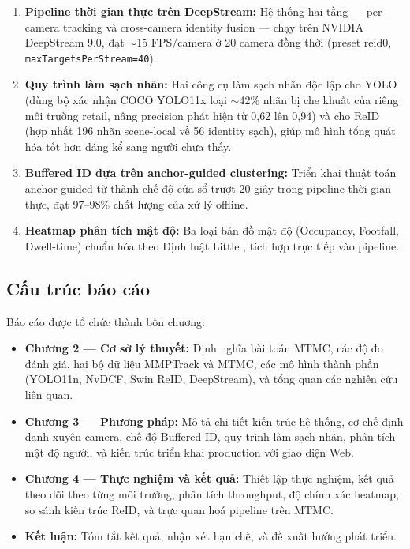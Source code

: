 \documentclass{article} %
\begin{document}
\begin{enumerate}
    \item \textbf{Pipeline thời gian thực trên DeepStream:} Hệ thống hai tầng --- per-camera tracking và cross-camera identity fusion --- chạy trên NVIDIA DeepStream 9.0, đạt $\sim$15 FPS/camera ở 20 camera đồng thời (preset reid0, \texttt{maxTargetsPerStream=40}).

    \item \textbf{Quy trình làm sạch nhãn:} Hai công cụ làm sạch nhãn độc lập cho YOLO (dùng bộ xác nhận COCO YOLO11x loại $\sim$42\% nhãn bị che khuất của riêng môi trường retail, nâng precision phát hiện từ 0,62 lên 0,94) và cho ReID (hợp nhất 196 nhãn scene-local về 56 identity sạch), giúp mô hình tổng quát hóa tốt hơn đáng kể sang người chưa thấy.

    \item \textbf{Buffered ID dựa trên anchor-guided clustering:} Triển khai thuật toán anchor-guided từ \cite{Huang2023} thành chế độ cửa sổ trượt 20 giây trong pipeline thời gian thực, đạt 97--98\% chất lượng của xử lý offline.

    \item \textbf{Heatmap phân tích mật độ:} Ba loại bản đồ mật độ (Occupancy, Footfall, Dwell-time) chuẩn hóa theo Định luật Little \cite{Little1961}, tích hợp trực tiếp vào pipeline.
\end{enumerate}

\subsection{Cấu trúc báo cáo}

Báo cáo được tổ chức thành bốn chương:

\begin{itemize}
    \item \textbf{Chương 2 --- Cơ sở lý thuyết:} Định nghĩa bài toán MTMC, các độ đo đánh giá, hai bộ dữ liệu MMPTrack và MTMC, các mô hình thành phần (YOLO11n, NvDCF, Swin ReID, DeepStream), và tổng quan các nghiên cứu liên quan.

    \item \textbf{Chương 3 --- Phương pháp:} Mô tả chi tiết kiến trúc hệ thống, cơ chế định danh xuyên camera, chế độ Buffered ID, quy trình làm sạch nhãn, phân tích mật độ người, và kiến trúc triển khai production với giao diện Web.

    \item \textbf{Chương 4 --- Thực nghiệm và kết quả:} Thiết lập thực nghiệm, kết quả theo dõi theo từng môi trường, phân tích throughput, độ chính xác heatmap, so sánh kiến trúc ReID, và trực quan hoá pipeline trên MTMC.

    \item \textbf{Kết luận:} Tóm tắt kết quả, nhận xét hạn chế, và đề xuất hướng phát triển.
\end{itemize}
\end{document}
